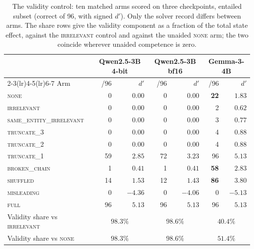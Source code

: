 \documentclass[10pt,twocolumn]{article}
\begin{document}
\begin{table}[tb]
\centering\small
\caption{The validity control: ten matched arms scored on three checkpoints, entailed
subset (correct of 96, with signed $d'$). Only the solver record differs between
arms. The share rows give the validity component as a fraction of the total state
effect, against the \textsc{irrelevant} control and against the unaided
\textsc{none} arm; the two coincide wherever unaided competence is zero.}
\label{tab:arms}
\begin{tabular}{lrrrrrr}
\toprule
& \multicolumn{2}{c}{Qwen2.5-3B 4-bit} & \multicolumn{2}{c}{Qwen2.5-3B bf16}
& \multicolumn{2}{c}{Gemma-3-4B} \\
\cmidrule(lr){2-3}\cmidrule(lr){4-5}\cmidrule(lr){6-7}
Arm & /96 & $d'$ & /96 & $d'$ & /96 & $d'$ \\
\midrule
\textsc{none}                    &  0 & $0.00$ &  0 & $0.00$ & \textbf{22} & $1.83$ \\
\textsc{irrelevant}              &  0 & $0.00$ &  0 & $0.00$ &  2 & $0.62$ \\
\textsc{same\_entity\_irrelevant}&  0 & $0.00$ &  0 & $0.00$ &  3 & $0.77$ \\
\textsc{truncate\_3}             &  0 & $0.00$ &  0 & $0.00$ &  4 & $0.88$ \\
\textsc{truncate\_2}             &  0 & $0.00$ &  0 & $0.00$ &  4 & $0.88$ \\
\textsc{truncate\_1}             & 59 & $2.85$ & 72 & $3.23$ & 96 & $5.13$ \\
\textsc{broken\_chain}           &  1 & $0.41$ &  1 & $0.41$ & \textbf{58} & $2.83$ \\
\textsc{shuffled}                & 14 & $1.53$ & 12 & $1.43$ & \textbf{86} & $3.80$ \\
\textsc{misleading}              &  0 & $-4.36$ &  0 & $-4.06$ &  0 & $-5.13$ \\
\textsc{full}                    & 96 & $5.13$ & 96 & $5.13$ & 96 & $5.13$ \\
\midrule
Validity share vs \textsc{irrelevant} & \multicolumn{2}{c}{$98.3\%$}
 & \multicolumn{2}{c}{$98.6\%$} & \multicolumn{2}{c}{$\mathbf{40.4\%}$} \\
Validity share vs \textsc{none}       & \multicolumn{2}{c}{$98.3\%$}
 & \multicolumn{2}{c}{$98.6\%$} & \multicolumn{2}{c}{$\mathbf{51.4\%}$} \\
\bottomrule
\end{tabular}
\end{table}
\end{document}
